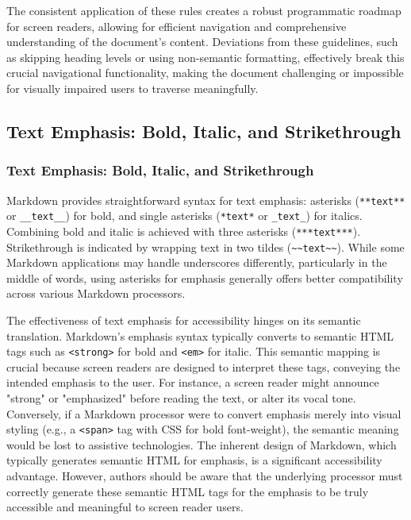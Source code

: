 The consistent application of these rules creates a robust programmatic roadmap for screen readers, allowing for efficient navigation and comprehensive understanding of the document's content. Deviations from these guidelines, such as skipping heading levels or using non-semantic formatting, effectively break this crucial navigational functionality, making the document challenging or impossible for visually impaired users to traverse meaningfully.

\subsection{Text Emphasis: Bold, Italic, and Strikethrough}
\subsubsection{Text Emphasis: Bold, Italic, and Strikethrough}

Markdown provides straightforward syntax for text emphasis: asterisks (\texttt{**text**} or \texttt{\_\_text\_\_}) for bold, and single asterisks (\texttt{*text*} or \texttt{\_text\_}) for italics. \cite{MarkdownGuide,MarkdownGuideExtended,MarkdownToolbox} Combining bold and italic is achieved with three asterisks (\texttt{***text***}). \cite{MarkdownGuide} Strikethrough is indicated by wrapping text in two tildes (\texttt{\~{}\~{}text\~{}\~{}}). \cite{MarkdownGuideExtended} While some Markdown applications may handle underscores differently, particularly in the middle of words, using asterisks for emphasis generally offers better compatibility across various Markdown processors. \cite{MarkdownGuide}

The effectiveness of text emphasis for accessibility hinges on its semantic translation. Markdown's emphasis syntax typically converts to semantic HTML tags such as \texttt{<strong>} for bold and \texttt{<em>} for italic. This semantic mapping is crucial because screen readers are designed to interpret these tags, conveying the intended emphasis to the user. For instance, a screen reader might announce "strong" or "emphasized" before reading the text, or alter its vocal tone. Conversely, if a Markdown processor were to convert emphasis merely into visual styling (e.g., a \texttt{<span>} tag with CSS for bold font-weight), the semantic meaning would be lost to assistive technologies. \cite{UniversalDesign} The inherent design of Markdown, which typically generates semantic HTML for emphasis, is a significant accessibility advantage. However, authors should be aware that the underlying processor must correctly generate these semantic HTML tags for the emphasis to be truly accessible and meaningful to screen reader users.

